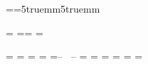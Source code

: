 %
%


\def\formatpage{
\hsize150truemm
\vsize 240truemm
\hoffset=5truemm
\voffset=-3truemm
\pretolerance=500
\tolerance=1000
\brokenpenalty=5000
\parindent3mm
}

\def\olspept{
\hsize180truemm\vsize 270truemm\hoffset=-10truemm\voffset=-13truemm
\pretolerance=500\tolerance=1000\brokenpenalty=5000
\parindent3mm
}


\def\dimstand{\hsize 150truemm\vsize 240truemm\hoffset=5truemm\voffset=0truemm}

\def\dimart{\hsize126truemm\vsize186truemm\hoffset16truemm\voffset=24truemm}




\interfootnoteskip=0pt
\let\note=\numberedfootnote
\everyfootnote={\eightpoint\leftskip=5truemm\rightskip5truemm}




\newcount\chstart
\chstart=\pageno
\headline={\ifnum\pageno=\chstart {\hfill} \else {\hss \tenrm --\ \folio\ --\hss}\fi}
\footline={\hfill}
\normalbaselines
\frenchspacing

\newif\ifMidFolio
\MidFoliotrue            %

\newif\ifpagetitre \pagetitretrue
\newtoks\hautpagetitre \hautpagetitre={\hfill}
\newtoks\baspagetitre \baspagetitre={\hfill}
\newtoks\auteurcourant \auteurcourant={\hfill}
\newtoks\titrecourant \titrecourant={\hfill}
\newtoks\hautpagegauche
\newtoks\hautpagedroite
\newtoks\hautpagemilieu
\hautpagemilieu={\tenrm\hfil -- \folio\ -- \hfil}
\hautpagegauche={\ifMidFolio\the\hautpagemilieu\else\tenrm\folio\hfil\the\auteurcourant\hfil\fi}
\hautpagedroite={\ifMidFolio\the\hautpagemilieu\else\hfil\the\titrecourant\hfil\tenrm\folio\fi}
\newtoks\baspagegauche \baspagegauche={\hfil}
\newtoks\baspagedroite \baspagedroite={\hfil}
\headline={\ifpagetitre\the\hautpagetitre
\else\ifodd\pageno\the\hautpagedroite\else\the\hautpagegauche\fi\fi }
\footline={\ifpagetitre\the\baspagetitre
\else\ifodd\pageno\the\baspagedroite
\else\the\baspagegauche\fi\fi \global\pagetitrefalse}

